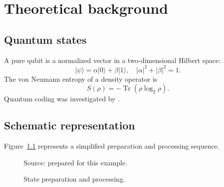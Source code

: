 \chapter{Theoretical background}
\label{cap:fundamentacao}
\section{Quantum states}
A pure qubit is a normalized vector in a two-dimensional Hilbert space:
\begin{equation}\label{eq:qubit}
\lvert\psi\rangle=\alpha\lvert0\rangle+\beta\lvert1\rangle,\quad |\alpha|^{2}+|\beta|^{2}=1.
\end{equation}
The von Neumann entropy of a density operator is
\begin{equation}\label{eq:entropia}
S(\rho)=-\operatorname{Tr}(\rho\log_{2}\rho).
\end{equation}
Quantum coding was investigated by \textcite{schumacher1995}.

\section{Schematic representation}
Figure~\ref{fig:fluxo} represents a simplified preparation and processing sequence.
\begin{figure}[htbp]
\centering
\caption{State preparation and processing.}\label{fig:fluxo}
\vspace{.35cm}
\par\medskip
\begin{minipage}{.55\textwidth}
\raggedright\footnotesize Source: prepared for this example.
\end{minipage}
\end{figure}
